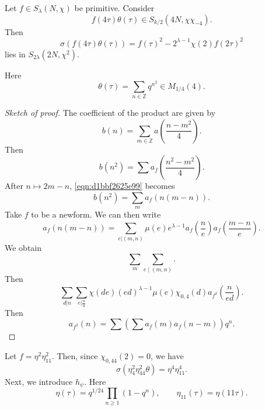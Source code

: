 \documentclass[reqno]{amsart} 
\begin{document}
\begin{theorem}[Selberg]
  Let $f \in S_\lambda (N, \chi )$ be primitive.  Consider
  \begin{equation*}
    f (4 \tau ) \theta (\tau )
    \in S_{k / 2 } (4 N, \chi \chi_{- 4}).
  \end{equation*}
  Then
  \begin{equation*}
    \sigma (f (4 \tau ) \theta (\tau) )
    = f (\tau)^2 - 2^{\lambda - 1 } \chi (2) f (2 \tau )^2 
  \end{equation*}
  lies in $S_{2 \lambda } (2 N, \chi^2 )$.
\end{theorem}
Here
\begin{equation*}
  \theta (\tau) = \sum_{n \in \mathbb{Z} } q^{n^2 } \in M_{1/4} (4).
\end{equation*}
\begin{proof}[Sketch of proof]
  The coefficient of the product are given by
  \begin{equation*}
    b (n) = \sum_{m \in \mathbb{Z} } a \left( \frac{n - m^2 }{4} \right).
  \end{equation*}
  Then
  \begin{equation}\label{eqn:d1bbf2625e99}
    b (n^2 )
    = \sum a_f \left( \frac{n^2 - m^2 }{4} \right).
  \end{equation}
  After $n \mapsto 2 m - n$, \eqref{eqn:d1bbf2625e99} becomes
  \begin{equation*}
    b (n^2 ) = \sum_m a_f (n (m - n )).
  \end{equation*}
  Take $f$ to be a newform.  We can then write
  \begin{equation*}
    a_f (n (m - n))
    =
    \sum_{e | (m,n)}
    \mu(e) e^{\lambda - 1}
    a_f \left( \frac{n}{e} \right)
    a_f \left( \frac{m - n}{e} \right).
  \end{equation*}
  We obtain
  \begin{equation*}
    \sum_m \sum_{e \mid (m, n)}.
  \end{equation*}
  Then
  \begin{equation*}
    \sum_{d | n} \sum_{e | \tfrac{n}{a}}
    \chi (d e ) (e d )^{\lambda - 1}
    \mu (e) \chi_{0, 4} (d)
    a_{f^2 } \left( \frac{n}{e d} \right).
  \end{equation*}
  Then
  \begin{equation*}
    a_{f^2 } (n)
    = \sum \left( \sum a_f (m) a_f (n - m ) \right) q^n.
  \end{equation*}
\end{proof}
\begin{example}
  Let $f = \eta^2 \eta_{1 1 }^2 $.  Then, since $\chi_{0, 44} (2) = 0$, we have
  \begin{equation*}
    \sigma (\eta_4^2 \eta_{44 }^2 \theta )
    = \eta^4 \eta_{1 1}^4.
  \end{equation*}
  Next, we introduce $h_\psi$.  Here
  \begin{equation*}
    \eta (\tau) = q^{1/24} \prod_{n \geq 1} (1 - q^n),
    \qquad
    \eta_{11} (\tau ) = \eta (11 \tau).
  \end{equation*}
\end{example}
\end{document}
